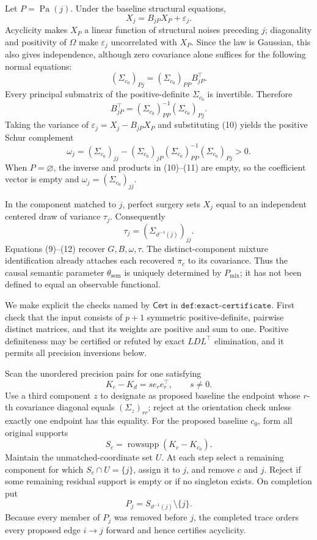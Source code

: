 Let \(P=\operatorname{Pa}(j)\).  Under the baseline structural equations,
\[
 X_j=B_{jP}X_P+\varepsilon_j .
\]
Acyclicity makes \(X_P\) a linear function of structural noises preceding
\(j\); diagonality and positivity of \(\Omega\) make
\(\varepsilon_j\) uncorrelated with \(X_P\).  Since the law is Gaussian,
this also gives independence, although zero covariance alone suffices for
the following normal equations:
\[
 (\Sigma_{c_0})_{Pj}
 =(\Sigma_{c_0})_{PP}B_{jP}^{\top}.
\]
Every principal submatrix of the positive-definite
\(\Sigma_{c_0}\) is invertible.  Therefore
\[
 B_{jP}^{\top}
 =(\Sigma_{c_0})_{PP}^{-1}(\Sigma_{c_0})_{Pj}.                      \tag{10}
\]
Taking the variance of
\(\varepsilon_j=X_j-B_{jP}X_P\) and substituting (10) yields the positive
Schur complement
\[
 \omega_j
 =(\Sigma_{c_0})_{jj}
  -(\Sigma_{c_0})_{jP}
   (\Sigma_{c_0})_{PP}^{-1}
   (\Sigma_{c_0})_{Pj}>0.                                         \tag{11}
\]
When \(P=\varnothing\), the inverse and products in (10)--(11) are empty,
so the coefficient vector is empty and
\(\omega_j=(\Sigma_{c_0})_{jj}\).

In the component matched to \(j\), perfect surgery sets
\(X_j\) equal to an independent centered draw of variance \(\tau_j\).
Consequently
\[
 \tau_j=(\Sigma_{\vartheta^{-1}(j)})_{jj}.                          \tag{12}
\]
Equations (9)--(12) recover \(G,B,\omega,\tau\).  The distinct-component
mixture identification already attaches each recovered \(\pi_c\) to its
covariance.  Thus the causal semantic parameter
\(\theta_{\mathrm{sem}}\) is uniquely determined by \(P_{\mathrm{mix}}\);
it has not been defined to equal an observable functional.

We make explicit the checks named by \(\mathsf{Cert}\) in
\(\texttt{def:exact-certificate}\).  First check that the input consists
of \(p+1\) symmetric positive-definite, pairwise distinct matrices, and
that its weights are positive and sum to one.  Positive definiteness may
be certified or refuted by exact \(LDL^{\top}\) elimination, and it permits
all precision inversions below.

Scan the unordered precision pairs for one satisfying
\[
 K_c-K_d=s e_re_r^{\top},\qquad s\neq0.                            \tag{13}
\]
Use a third component \(z\) to designate as proposed baseline the endpoint
whose \(r\)-th covariance diagonal equals \((\Sigma_z)_{rr}\); reject at
the orientation check unless exactly one endpoint has this equality.
For the proposed baseline \(c_0\), form all original supports
\[
 S_c=\operatorname{rowsupp}(K_c-K_{c_0}).
\]
Maintain the unmatched-coordinate set \(U\).  At each step select a
remaining component for which \(S_c\cap U=\{j\}\), assign it to \(j\),
and remove \(c\) and \(j\).  Reject if some remaining residual support is
empty or if no singleton exists.  On completion put
\[
 P_j=S_{\vartheta^{-1}(j)}\setminus\{j\}.                           \tag{14}
\]
Because every member of \(P_j\) was removed before \(j\), the completed
trace orders every proposed edge \(i\to j\) forward and hence certifies
acyclicity.

